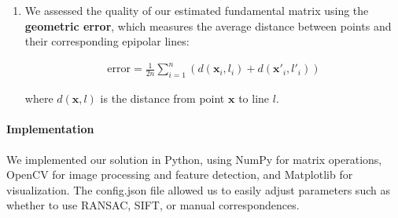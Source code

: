 \begin{enumerate}
\item We assessed the quality of our estimated fundamental matrix using the \textbf{geometric error}, which measures the average distance between points and their corresponding epipolar lines:

\begin{align*}
    \text{error} = \frac{1}{2n} \sum_{i=1}^{n} \left( d(\mathbf{x}_i, l_i) + d(\mathbf{x}'_i, l'_i) \right)
\end{align*}

where $d(\mathbf{x}, l)$ is the distance from point $\mathbf{x}$ to line $l$.
\end{enumerate}

\paragraph{Implementation} We implemented our solution in Python, using NumPy for matrix operations, OpenCV for image processing and feature detection, and Matplotlib for visualization. The config.json file allowed us to easily adjust parameters such as whether to use RANSAC, SIFT, or manual correspondences.

